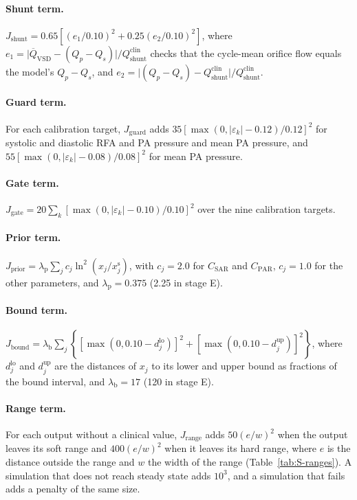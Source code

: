 \documentclass{article}
\begin{document}
\paragraph{Shunt term.} $J_{\mathrm{shunt}} = 0.65\left[(e_1/0.10)^2 + 0.25(e_2/0.10)^2\right]$, where $e_1 = \lvert \overline{Q}_{\mathrm{VSD}} - (Q_p - Q_s)\rvert / Q_{\mathrm{shunt}}^{\mathrm{clin}}$ checks that the cycle-mean orifice flow equals the model's $Q_p - Q_s$, and $e_2 = \lvert (Q_p - Q_s) - Q_{\mathrm{shunt}}^{\mathrm{clin}}\rvert / Q_{\mathrm{shunt}}^{\mathrm{clin}}$.

\paragraph{Guard term.} For each calibration target, $J_{\mathrm{guard}}$ adds $35[\max(0, \lvert\varepsilon_k\rvert - 0.12)/0.12]^2$ for systolic and diastolic RFA and PA pressure and mean PA pressure, and $55[\max(0, \lvert\varepsilon_k\rvert - 0.08)/0.08]^2$ for mean PA pressure.

\paragraph{Gate term.} $J_{\mathrm{gate}} = 20\sum_{k}[\max(0, \lvert\varepsilon_k\rvert - 0.10)/0.10]^2$ over the nine calibration targets.

\paragraph{Prior term.} $J_{\mathrm{prior}} = \lambda_{\mathrm{p}}\sum_j c_j \ln^2(x_j/x_j^{\mathrm{s}})$, with $c_j = 2.0$ for $C_{\mathrm{SAR}}$ and $C_{\mathrm{PAR}}$, $c_j = 1.0$ for the other parameters, and $\lambda_{\mathrm{p}} = 0.375$ (2.25 in stage E).

\paragraph{Bound term.} $J_{\mathrm{bound}} = \lambda_{\mathrm{b}}\sum_j\left\{[\max(0, 0.10 - d_j^{\mathrm{lo}})]^2 + [\max(0, 0.10 - d_j^{\mathrm{up}})]^2\right\}$, where $d_j^{\mathrm{lo}}$ and $d_j^{\mathrm{up}}$ are the distances of $x_j$ to its lower and upper bound as fractions of the bound interval, and $\lambda_{\mathrm{b}} = 17$ (120 in stage E).

\paragraph{Range term.} For each output without a clinical value, $J_{\mathrm{range}}$ adds $50(e/w)^2$ when the output leaves its soft range and $400(e/w)^2$ when it leaves its hard range, where $e$ is the distance outside the range and $w$ the width of the range (Table~\ref{tab:S-ranges}). A simulation that does not reach steady state adds $10^3$, and a simulation that fails adds a penalty of the same size.
\end{document}
